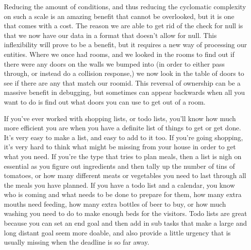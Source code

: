 Reducing the amount of conditions, and thus reducing the cyclomatic complexity
on such a scale is an amazing benefit that cannot be overlooked, but it is one
that comes with a cost. The reason we are able to get rid of the check for null
is that we now have our data in a format that doesn't allow for null. This
inflexibility will prove to be a benefit, but it requires a new way of
processing our entities. Where we once had rooms, and we looked in the rooms to
find out if there were any doors on the walls we bumped into (in order to
either pass through, or instead do a collision response,) we now look in the
table of doors to see if there are any that match our roomid. This reversal of
ownership can be a massive benefit in debugging, but sometimes can appear
backwards when all you want to do is find out what doors you can use to get out
of a room.

If you've ever worked with shopping lists, or todo lists, you'll know how much
more efficient you are when you have a definite list of things to get or get
done. It's very easy to make a list, and easy to add to it too. If you're going
shopping, it's very hard to think what might be missing from your house in
order to get what you need. If you're the type that tries to plan meals, then a
list is nigh on essential as you figure out ingredients and then tally up the
number of tins of tomatoes, or how many different meats or vegetables you need
to last through all the meals you have planned. If you have a todo list and a
calendar, you know who is coming and what needs to be done to prepare for them,
how many extra mouths need feeding, how many extra bottles of beer to buy, or
how much washing you need to do to make enough beds for the visitors. Todo
lists are great because you can set an end goal and then add in sub tasks that
make a large and long distant goal seem more doable, and also provide a little
urgency that is usually missing when the deadline is so far away.


